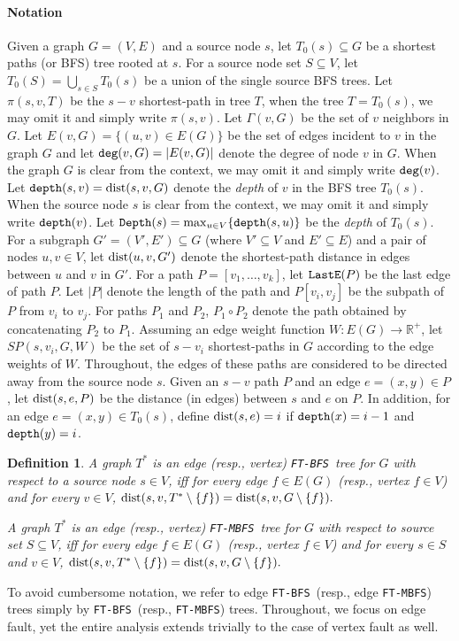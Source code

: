 \documentclass[12pt]{article}
\newtheorem{definition}[theorem]{Definition}
\newcommand{\REAL}{\mathbb R}
\def\deg{\mbox{\tt deg}}
\def\depth{\mbox{\tt depth}}
\newcommand{\dist}{\mbox{\rm dist}}
\def\LastE{\mbox{\tt LastE}}
\def\Depth{\mbox{\tt Depth}}
\def\FTMBFS{\mbox{\tt FT-MBFS}}
\def\FTBFS{\mbox{\tt FT-BFS}}
\begin{document}
\paragraph{Notation}
Given a graph $G=(V,E)$ and a source node $s$, let $T_0(s) \subseteq G$ be
a shortest paths (or BFS) tree rooted at $s$. For a source node set $S \subseteq V$,
let $T_0(S)=\bigcup_{s \in S} T_0(s)$ be a union of the single source BFS trees.
Let $\pi(s, v,T)$ be the $s-v$ shortest-path in tree $T$, when the tree $T=T_0(s)$, we may omit it and simply write $\pi(s,v)$.
Let $\Gamma(v, G)$ be the set of $v$ neighbors in $G$. Let $E(v,G)=\{(u,v) \in E(G)\}$ be the set of edges incident to $v$
in the graph $G$ and let $\deg(v,G)=|E(v,G)|$ denote the degree of node $v$ in $G$. When the graph $G$ is clear from the context,
we may omit it and simply write $\deg(v)$.
Let $\depth(s, v) = \dist(s,v,G)$ denote the {\em depth} of $v$
in the BFS tree $T_0(s)$. When the source node $s$ is clear from the context,
we may omit it and simply write $\depth(v)$.
Let $\Depth(s)=\max_{u \in V} \{ \depth(s, u) \}$ be the {\em depth}
of $T_0(s)$.
For a subgraph $G'=(V', E') \subseteq G$
(where $V' \subseteq V$ and $E' \subseteq E$)
and a pair of nodes $u,v \in V$, let $\dist(u,v, G')$ denote the
shortest-path distance in edges between $u$ and $v$ in $G'$.
For a path $P=[v_1, \ldots, v_k]$, let $\LastE(P)$ be the last edge of path $P$. Let $|P|$ denote the length of the path and $P[v_i, v_j]$ be the subpath of $P$ from $v_i$ to $v_j$. For paths $P_1$ and $P_2$, $P_1 \circ P_2$ denote the path obtained by concatenating $P_2$ to $P_1$. Assuming an edge weight function $W: E(G)\to \REAL^{+}$, let $SP(s, v_i, G, W)$ be the set of $s-v_i$ shortest-paths in $G$ according to the edge weights of $W$.  Throughout, the edges of these paths are considered to be directed away from the source node $s$. Given an $s-v$ path $P$ and an edge $e=(x,y) \in P$, let $\dist(s, e, P)$ be the distance (in edges) between $s$ and $e$ on $P$. In addition, for an edge $e=(x,y)\in T_0(s)$, define $\dist(s,e)=i$ if $\depth(x)=i-1$ and $\depth(y)=i$.
\begin{definition}
A graph $T^{*}$ is an edge (resp., vertex) \FTBFS\ tree for $G$ with respect to a source node $s \in V$, iff for every edge $f \in E(G)$ (resp., vertex $f \in V$) and for every $v \in V$,
$\dist(s, v, T^{*} \setminus \{f\})=\dist(s, v, G \setminus \{f\}).$
\par
A graph $T^{*}$ is an edge (resp., vertex) \FTMBFS\ tree for $G$ with respect to source set $S \subseteq V$, iff for every edge $f \in E(G)$ (resp., vertex $f \in V$) and for every $s \in S$ and $v \in V$,
$\dist(s, v, T^{*} \setminus \{f\})=\dist(s, v, G \setminus \{f\}).$
\end{definition}
To avoid cumbersome notation, we refer to
edge \FTBFS\ (resp., edge \FTMBFS) trees simply by \FTBFS\ (resp., \FTMBFS) trees. Throughout, we focus on edge fault, yet the entire analysis extends trivially to the case of vertex fault as well.
\end{document}
